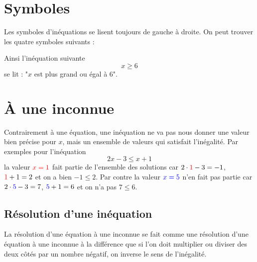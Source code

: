 \section{Symboles}

Les symboles d'inéquations se lisent toujours de gauche à droite. On peut trouver les quatre symboles suivants :

\hspace{5mm}


\hspace{5mm}

Ainsi l'inéquation suivante 
$$
x \geq 6
$$
se lit : "$x$ est plus grand ou égal à $6$".

\section{À une inconnue}

Contrairement à une équation, une inéquation ne va pas nous donner une valeur bien précise pour $x$, mais un ensemble de valeurs qui satisfait l'inégalité. Par exemples pour l'inéquation
$$
2x-3 \leq x+1
$$
la valeur $\textcolor{red}{x=1}$ fait partie de l'ensemble des solutions car $2\cdot \textcolor{red}{1} -3 = -1$, $\textcolor{red}{1}+1 = 2$ et on a bien $-1\leq 2$. Par contre la valeur $\textcolor{blue}{x=5}$ n'en fait pas partie car $2\cdot \textcolor{blue}{5} -3 = 7$, $\textcolor{blue}{5}+1 = 6$ et on n'a pas $7\leq 6$.

\subsection{Résolution d'une inéquation}

La résolution d'une équation à une inconnue se fait comme une résolution d'une équation à une inconnue à la différence que si l'on doit multiplier ou diviser des deux côtés par un nombre négatif, on inverse le sens de l'inégalité.

